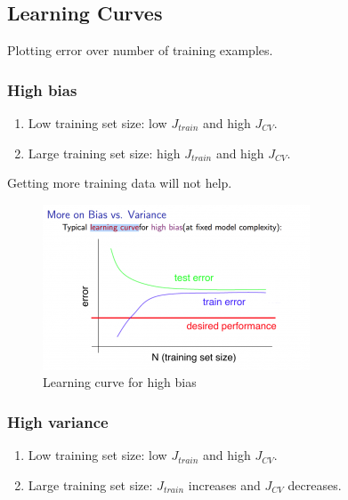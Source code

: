 \subsection{Learning Curves}
    Plotting error over number of training examples. 
    \subsubsection{High bias}
        \begin{enumerate}
            \item Low training set size: low $J_{train}$ and high $J_{CV}$.
            \item Large training set size: high $J_{train}$ and high $J_{CV}$.
        \end{enumerate}

        Getting more training data will not help. 
        \begin{figure}[htbp]
            \centering
            \includegraphics[width=\textwidth]{image/learning-curve-high-bias.png}
            \caption{Learning curve for high bias}
            \label{fig:learning-curve-high-bias}
        \end{figure}
    
    \subsubsection{High variance}
        \begin{enumerate}
            \item Low training set size: low $J_{train}$ and high $J_{CV}$.
            \item Large training set size: $J_{train}$ increases and $J_{CV}$ decreases.
        \end{enumerate}


